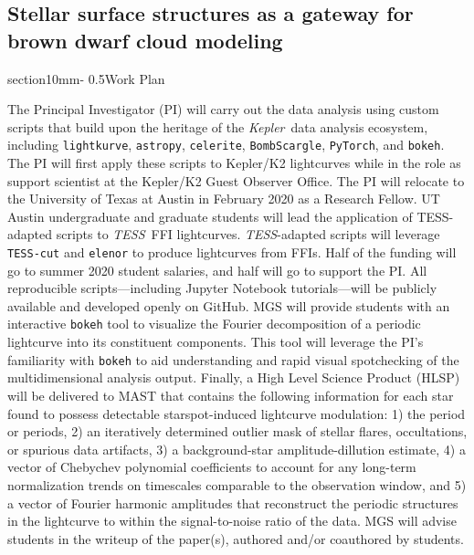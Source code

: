 \documentclass[letterpaper,11pt]{article}
\makeatletter
\renewcommand{\section}{\@startsection%
{section}{1}{0mm}{-\baselineskip}%
{0.5\baselineskip}{\normalfont\Large\bfseries}}%
\newcommand{\tess}{{\it TESS}}
\newcommand{\kepler}{{\it Kepler}}
\makeatother
\begin{document}
\subsection{Stellar surface structures as a gateway for brown dwarf cloud modeling}

\section{Work Plan}

The Principal Investigator (PI) will carry out the data analysis using custom scripts that build upon the heritage of the \kepler\ data analysis ecosystem, including \texttt{lightkurve}, \texttt{astropy}, \texttt{celerite}, \texttt{BombScargle}, \texttt{PyTorch}, and \texttt{bokeh}.  The PI will first apply these scripts to Kepler/K2 lightcurves while in the role as support scientist at the Kepler/K2 Guest Observer Office.  The PI will relocate to the University of Texas at Austin in February 2020 as a Research Fellow.  UT Austin undergraduate and graduate students will lead the application of TESS-adapted scripts to \tess\ FFI lightcurves.  \tess-adapted scripts will leverage \texttt{TESS-cut} and \texttt{elenor} to produce lightcurves from FFIs.  Half of the funding will go to summer 2020 student salaries, and half will go to support the PI.  All reproducible scripts---including Jupyter Notebook tutorials---will be publicly available and developed openly on GitHub.  MGS will provide students with an interactive \texttt{bokeh} tool to visualize the Fourier decomposition of a periodic lightcurve into its constituent components.  This tool will leverage the PI's familiarity with \texttt{bokeh} to aid understanding and rapid visual spotchecking of the multidimensional analysis output.  Finally, a High Level Science Product (HLSP) will be delivered to MAST that contains the following information for each star found to possess detectable starspot-induced lightcurve modulation: 1) the period or periods, 2) an iteratively determined outlier mask of stellar flares, occultations, or spurious data artifacts, 3) a background-star amplitude-dillution estimate, 4) a vector of Chebychev polynomial coefficients to account for any long-term normalization trends on timescales comparable to the observation window, and 5) a vector of Fourier harmonic amplitudes that reconstruct the periodic structures in the lightcurve to within the signal-to-noise ratio of the data.  MGS will advise students in the writeup of the paper(s), authored and/or coauthored by students.


\end{document}
